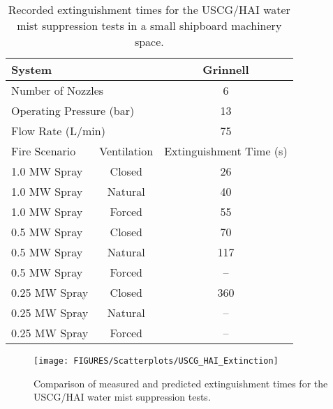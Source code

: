 \begin{table}[h!]
\caption[USCG/HAI water mist suppression extinguishment times.]{Recorded extinguishment times for the USCG/HAI water mist suppression tests in a small shipboard machinery space.}
\begin{center}
\begin{tabular}{|l|c|c|}
\hline
\multicolumn{2}{|l|}{System}                        & Grinnell \\ \hline  \hline
\multicolumn{2}{|l|}{Number of Nozzles}             & 6        \\ \hline
\multicolumn{2}{|l|}{Operating Pressure (bar)}      & 13        \\ \hline
\multicolumn{2}{|l|}{Flow Rate (L/min)}             & 75        \\ \hline \hline
Fire Scenario       & Ventilation                   & Extinguishment Time (s) \\ \hline \hline
1.0 MW Spray        & Closed                        & 26        \\ \hline
1.0 MW Spray        & Natural                       & 40        \\ \hline
1.0 MW Spray        & Forced                        & 55        \\ \hline
0.5 MW Spray        & Closed                        & 70        \\ \hline
0.5 MW Spray        & Natural                       & 117       \\ \hline
0.5 MW Spray        & Forced                        & --        \\ \hline
0.25 MW Spray       & Closed                        & 360       \\ \hline
0.25 MW Spray       & Natural                       & --        \\ \hline
0.25 MW Spray       & Forced                        & --        \\ \hline
\end{tabular}
\end{center}
\label{USCG_HAI_Times}
\end{table}

\begin{figure}[h!]
\begin{center}
\texttt{[image: FIGURES/Scatterplots/USCG\_HAI\_Extinction]}
\caption[Comparison of measured and predicted extinguishment times for the USCG/HAI water mist suppression tests.]{Comparison of measured and predicted extinguishment times for the USCG/HAI water mist suppression tests.}
\end{center}
\label{USCG_Scatter}
\end{figure}




